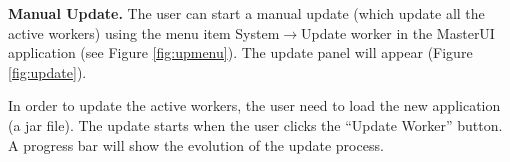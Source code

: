 \documentclass{article}
\begin{document}
\textbf{Manual Update.} The user can start a  manual update (which update all the active workers)  using the menu item System$\rightarrow$Update worker in the MasterUI application (see Figure \ref{fig:upmenu}). The update panel will appear (Figure \ref{fig:update}).
\begin{figure}[h!]
\end{figure}
\begin{figure}[h]
\end{figure}
In order to update the active workers, the user need to load the new application (a jar file). The update starts when the user   
clicks the ``Update Worker'' button. A progress bar will show the evolution of the update process.
\end{document}
